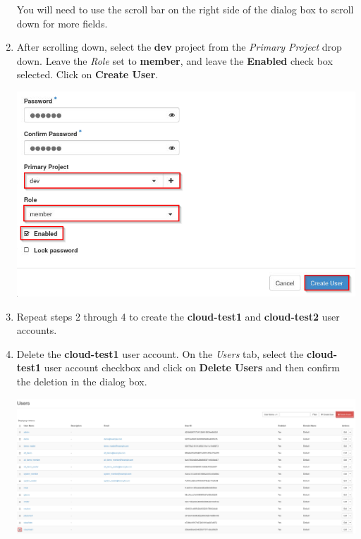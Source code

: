 \documentclass[letterpaper, 12pt]{article}
\begin{document}
\begin{enumerate}
    \begin{tipbox}{}
        You will need to use the scroll bar on the right side of the dialog box to scroll down for more fields.
    \end{tipbox}

    \item After scrolling down, select the \textbf{dev} project from the \textit{Primary Project} drop down. Leave the
    \textit{Role} set to \textbf{member}, and leave the \textbf{Enabled} check box selected. Click on
    \textbf{Create User}.

    \begin{center}
        \includegraphics[width=\linewidth]{images/part3/step4.png}
    \end{center}

    \item Repeat steps 2 through 4 to create the \textbf{cloud-test1} and \textbf{cloud-test2} user accounts.

    \item Delete the \textbf{cloud-test1} user account. On the \textit{Users} tab, select the \textbf{cloud-test1} user
    account checkbox and click on \textbf{Delete Users} and then confirm the deletion in the dialog box.

    \begin{center}
        \includegraphics[width=\linewidth]{images/part3/step6.png}
    \end{center}


\end{enumerate}
\end{document}
